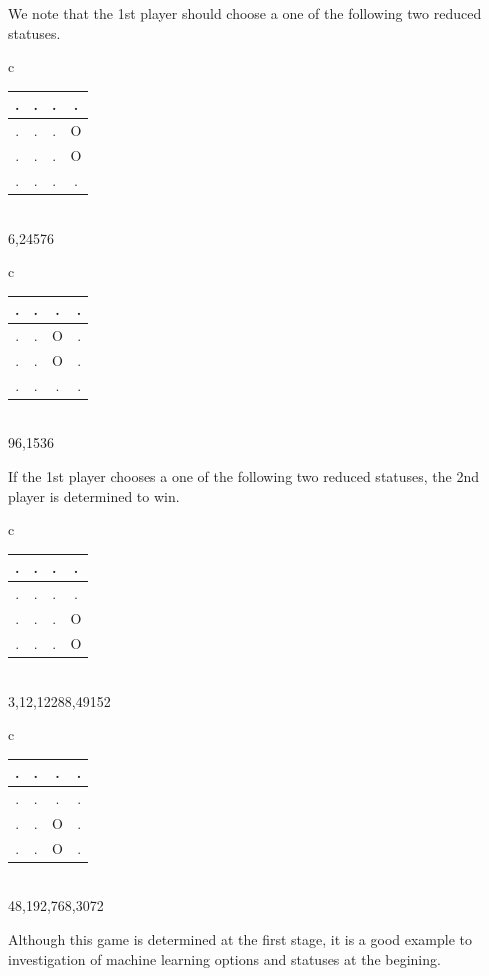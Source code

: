\documentclass{article}
\begin{document}
We note that the 1st player should choose a one of 
the following two reduced statuses.
\begin{center}
\begin{tabular}{c}
\begin{tabular}{|c|c|c|c|}\hline
.&.&.&.\\ \hline
.&.&.&O\\ \hline
.&.&.&O\\ \hline
.&.&.&.\\ \hline
\end{tabular} \\
{\tiny 6,24576}
\end{tabular}
\begin{tabular}{c}
\begin{tabular}{|c|c|c|c|}\hline
.&.&.&.\\ \hline
.&.&O&.\\ \hline
.&.&O&.\\ \hline
.&.&.&.\\ \hline
\end{tabular} \\
{\tiny 96,1536}
\end{tabular}
\end{center}
If the 1st player chooses a one of 
the following two reduced statuses,
the 2nd player is determined to win.
\begin{center}
\begin{tabular}{c}
\begin{tabular}{|c|c|c|c|}\hline
.&.&.&.\\ \hline
.&.&.&.\\ \hline
.&.&.&O\\ \hline
.&.&.&O\\ \hline
\end{tabular} \\
{\tiny 3,12,12288,49152}
\end{tabular}
\begin{tabular}{c}
\begin{tabular}{|c|c|c|c|}\hline
.&.&.&.\\ \hline
.&.&.&.\\ \hline
.&.&O&.\\ \hline
.&.&O&.\\ \hline
\end{tabular} \\
{\tiny 48,192,768,3072}
\end{tabular}
\end{center}
Although this game is determined at the first stage, it is a good
example to investigation of machine learning options and statuses
at the begining.
\end{document}
